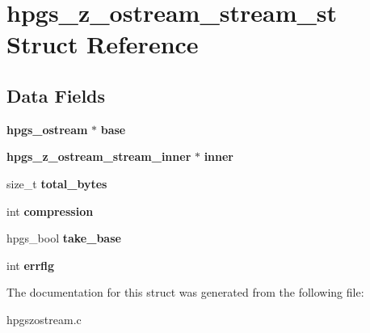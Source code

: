 \section{hpgs\_\-z\_\-ostream\_\-stream\_\-st Struct Reference}
\label{structhpgs__z__ostream__stream__st}
\subsection*{Data Fields}
\begin{DoxyCompactItemize}
\item 
{\bf hpgs\_\-ostream} $\ast$ {\bfseries base}\label{structhpgs__z__ostream__stream__st_af4c656b107f8787ee873903ea496529b}

\item 
{\bf hpgs\_\-z\_\-ostream\_\-stream\_\-inner} $\ast$ {\bfseries inner}\label{structhpgs__z__ostream__stream__st_ad47de913db1f06af5bf99ea71c5a92a0}

\item 
size\_\-t {\bfseries total\_\-bytes}\label{structhpgs__z__ostream__stream__st_a0f57bd373af13d181422c321b3a92143}

\item 
int {\bfseries compression}\label{structhpgs__z__ostream__stream__st_a214757f08b4fe37522b80e8b954c7da3}

\item 
hpgs\_\-bool {\bfseries take\_\-base}\label{structhpgs__z__ostream__stream__st_aaae0133cddb6d0b3711436081800309f}

\item 
int {\bfseries errflg}\label{structhpgs__z__ostream__stream__st_abaea281c2bc7d82823b42c9fa3d15b67}

\end{DoxyCompactItemize}


The documentation for this struct was generated from the following file:\begin{DoxyCompactItemize}
\item 
hpgszostream.c\end{DoxyCompactItemize}
